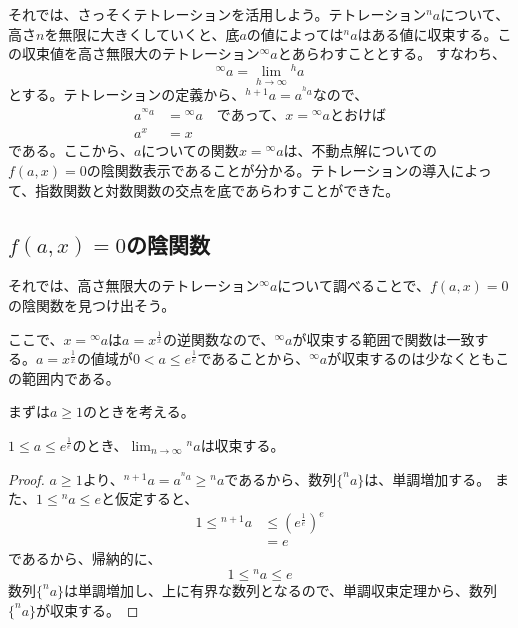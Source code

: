 	それでは、さっそくテトレーションを活用しよう。テトレーション$^n a$について、高さ$n$を無限に大きくしていくと、底$a$の値によっては$^n a$はある値に収束する。この収束値を高さ無限大のテトレーション$^\infty a$とあらわすこととする。
	すなわち、
	\begin{equation*}
		^\infty a = \lim_{h \to \infty} {^h a}
	\end{equation*}
	とする。テトレーションの定義から、$^{h+1} a = a^{^h a}$なので、
	\begin{align*}
		a ^{^\infty a} &= {^\infty a} \quad \text{であって、$x = {^\infty a}$とおけば} \\
		a^x &= x
	\end{align*}
	である。ここから、$a$についての関数$x = {^\infty a}$は、不動点解についての$f(a,x) = 0$の陰関数表示であることが分かる。テトレーションの導入によって、指数関数と対数関数の交点を底であらわすことができた。
	
\subsection{$f(a,x)=0$の陰関数}
	それでは、高さ無限大のテトレーション$^\infty a$について調べることで、$f(a,x)=0$の陰関数を見つけ出そう。
	
	ここで、$x = {^\infty a}$は$a = x^\frac{1}{x}$の逆関数なので、${^\infty a}$が収束する範囲で関数は一致する。$a = x^\frac{1}{x}$の値域が$0 < a \leq e^\frac{1}{e}$であることから、${^\infty a}$が収束するのは少なくともこの範囲内である。
	
	まずは$a \geq 1$のときを考える。
	\begin{theorem}
	\label{th:tetration_convergence_a_greater_1}
		$1 \leq a \leq e^\frac{1}{e}$のとき、$\lim_{n \to \infty} {^n a}$は収束する。
	\end{theorem}
	\begin{proof}
	
		$a \geq 1$より、$^{n+1} a = a ^{^n a} \geq {^n a}$であるから、数列$\{^n a\}$は、単調増加する。
		また、$1 \leq {^n a} \leq e$と仮定すると、
		\begin{align*}
			1 \leq {^{n+1} a} &\leq (e^\frac{1}{e})^e \\
							  &= e
		\end{align*}
		であるから、帰納的に、
		\begin{equation*}
			1 \leq {^n a} \leq e
		\end{equation*}
		数列$\{^n a\}$は単調増加し、上に有界な数列となるので、単調収束定理から、数列$\{^n a\}$が収束する。
	\end{proof}
	

